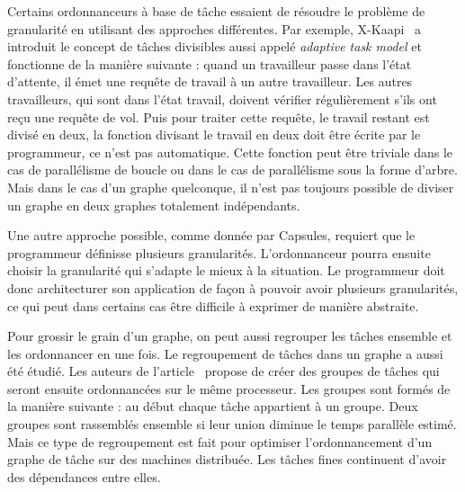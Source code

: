 Certains ordonnanceurs à base de tâche essaient de résoudre le problème de granularité en utilisant des approches différentes.
%
Par exemple, X-Kaapi~\cite{xkaapi} a introduit le concept de tâches divisibles aussi appelé {\em adaptive task model} et fonctionne de la manière suivante :
%
quand un travailleur passe dans l'état d'attente, il émet une requête de travail à un autre travailleur.
%
Les autres travailleurs, qui sont dans l'état travail, doivent vérifier régulièrement s'ils ont reçu une requête de vol.
%
Puis pour traiter cette requête, le travail restant est divisé en deux, la fonction divisant le travail en deux doit être écrite par le programmeur, ce n'est pas automatique.
%
Cette fonction peut être triviale dans le cas de parallélisme de boucle ou dans le cas de parallélisme sous la forme d'arbre.
%
Mais dans le cas d'un graphe quelconque, il n'est pas toujours possible de diviser un graphe en deux graphes totalement indépendants.



Une autre approche possible, comme donnée par Capsules\cite{capsules}, requiert que le programmeur définisse plusieurs granularités.
%
L'ordonnanceur pourra ensuite choisir la granularité qui s'adapte le mieux à la situation.
%
Le programmeur doit donc architecturer son application de façon à pouvoir avoir plusieurs granularités, ce qui peut dans certains cas être difficile à exprimer de manière abstraite.


Pour grossir le grain d'un graphe, on peut aussi regrouper les tâches ensemble et les ordonnancer en une fois.
%
Le regroupement de tâches dans un graphe a aussi été étudié.
%
Les auteurs de l'article~\cite{clustering_task} propose de créer des groupes de tâches qui seront ensuite ordonnancées sur le même processeur.
%
Les groupes sont formés de la manière suivante : au début chaque tâche appartient à un groupe.
%
Deux groupes sont rassemblés ensemble si leur union diminue le temps parallèle estimé.
%
Mais ce type de regroupement est fait pour optimiser l'ordonnancement d'un graphe de tâche sur des machines distribuée.
%
Les tâches fines continuent d'avoir des dépendances entre elles.
